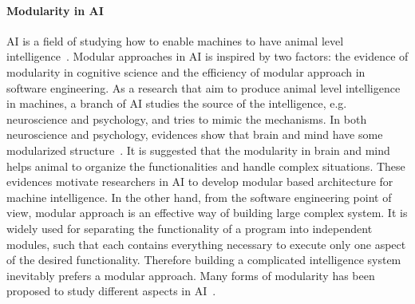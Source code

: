 \paragraph{Modularity in AI}
AI is a field of studying how to enable machines to have animal level intelligence~\citep{brooks1991intelligence}. Modular approaches in AI is inspired by two factors: the evidence of modularity in cognitive science and the efficiency of modular approach in software engineering.
As a research that aim to produce animal level intelligence in machines, a branch of AI studies the source of the intelligence, e.g. neuroscience and psychology, and tries to mimic the mechanisms. In both neuroscience and psychology, evidences show that brain and mind have some modularized structure~\citep{fodor1983modularity,peretz2003modularity,barrett2006modularity,sztarker2011brain}. It is suggested that the modularity in brain and mind helps animal to organize the functionalities and handle complex situations. These evidences motivate researchers in AI to develop modular based architecture for machine intelligence. In the other hand, from the software engineering point of view, modular approach is an effective way of building large complex system. It is widely used for separating the functionality of a program into independent modules, such that each contains everything necessary to execute only one aspect of the desired functionality. Therefore building a complicated intelligence system inevitably prefers a modular approach. Many forms of modularity has been proposed to study different aspects in AI~\citep{bryson2004modular}.


